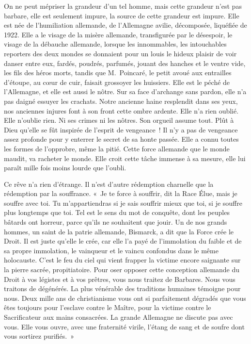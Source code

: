 \documentclass[french,twoside]{book} %
\begin{document}
On ne peut mépriser la grandeur d’un tel homme, mais cette grandeur n’est pas barbare, elle est seulement impure, la source de cette grandeur est impure. Elle est née de l’humiliation allemande, de l’Allemagne avilie, décomposée, liquéfiée de 1922. Elle a le visage de la misère allemande, transfigurée par le désespoir, le visage de la débauche allemande, lorsque les innommables, les intouchables reporters des deux mondes se donnaient pour un louis le hideux plaisir de voir danser entre eux, fardés, poudrés, parfumés, jouant des hanches et le ventre vide, les fils des héros morts, tandis que M. Poincaré, le petit avoué aux entrailles d’étoupe, au cœur de cuir, faisait grossoyer les huissiers. Elle est le péché de l’Allemagne, et elle est aussi le nôtre. Sur sa face d’archange sans pardon, elle n’a pas daigné essuyer les crachats. Notre ancienne haine resplendit dans ses yeux, nos anciennes injures font à son front cette ombre ardente. Elle n’a rien oublié. Elle n’oublie rien. Ni ses crimes ni les nôtres. Son orgueil assume tout. Plût à Dieu qu’elle se fût inspirée de l’esprit de vengeance ! Il n’y a pas de vengeance assez profonde pour y enterrer le secret de sa honte passée. Elle a connu toutes les formes de l’opprobre, même la pitié. Cette force allemande que le monde maudit, va racheter le monde. Elle croit cette tâche immense à sa mesure, elle lui paraît mille fois moins lourde que l’oubli.\par
Ce rêve n’a rien d’étrange. Il n’est d’autre rédemption charnelle que la rédemption par la souffrance. « Je te force à souffrir, dit la Race Élue, mais je souffre avec toi. Tu m’appartiendras si je sais souffrir mieux que toi, si je souffre plus longtemps que toi. Tel est le sens du mot de conquête, dont les peuples bâtards ont horreur, parce qu’ils ne souhaitent que jouir. Un de nos grands hommes, un saint de la patrie allemande, Bismarck, a dit que la Force crée le Droit. Il est juste qu’elle le crée, car elle l’a payé de l’immolation du faible et de sa propre immolation, le vainqueur et le vaincu confondus dans le même holocauste. C’est le feu du ciel qui vient frapper la victime encore saignante sur la pierre sacrée, propitiatoire. Pour oser opposer cette conception allemande du Droit à vos légistes et à vos prêtres, vous nous traitez de Barbares. Nous vous traitons de dégénérés. La plus vénérable des traditions humaines témoigne pour nous. Deux mille ans de christianisme vous ont si parfaitement dégradés que vous êtes toujours pour l’esclave contre le Maître, pour la victime contre le Sacrificateur aux mains consacrées. La grande Allemagne ne discute pas avec vous. Elle vous ouvre, avec une fraternité virile, l’étang de sang et de soufre dont vous sortirez purifiés. »\par
 \par
\end{document}
